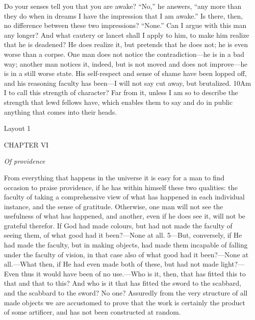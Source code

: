 Do your senses tell you that you are awake? ``No,'' he answers, ``any more than they do when in dreams I have the impression that I am awake.'' Is there, then, no difference between these two impressions? ``None.'' Can I argue with this man any longer? And what cautery or lancet shall I apply to him, to make him realize that he is deadened? He does realize it, but pretends that he does not; he is even worse than a corpse. One man does not notice the contradiction—he is in a bad way; another man notices it, indeed, but is not moved and does not improve—he is in a still worse state. His self-respect and sense of shame have been lopped off, and his reasoning faculty has been—I will not say cut away, but brutalized. 10Am I to call this strength of character? Far from it, unless I am so to describe the strength that lewd fellows have, which enables them to say and do in public anything that comes into their heads.



Layout 1

CHAPTER VI

\emph{Of providence}

From everything that happens in the universe it is easy for a man to find occasion to praise providence, if he has within himself these two qualities: the faculty of taking a comprehensive view of what has happened in each individual instance, and the sense of gratitude. Otherwise, one man will not see the usefulness of what has happened, and another, even if he does see it, will not be grateful therefor. If God had made colours, but had not made the faculty of seeing them, of what good had it been?—None at all. 5—But, conversely, if He had made the faculty, but in making objects, had made them incapable of falling under the faculty of vision, in that case also of what good had it been?—None at all.—What then, if He had even made both of these, but had not made light?—Even thus it would have been of no use.—Who is it, then, that has fitted this to that and that to this? And who is it that has fitted the sword to the scabbard, and the scabbard to the sword? No one? Assuredly from the very structure of all made objects we are accustomed to prove that the work is certainly the product of some artificer, and has not been constructed at random.

